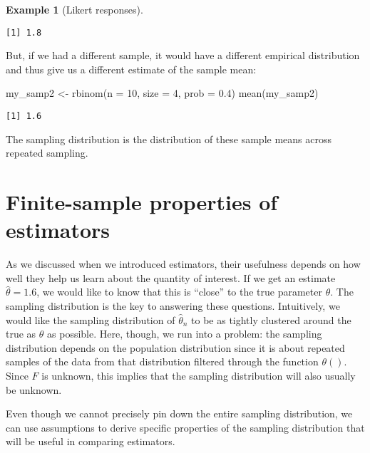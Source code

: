 \documentclass[
  letterpaper,
  DIV=11,
  numbers=noendperiod]{scrreprt}
\newenvironment{Shaded}{\begin{snugshade}}{\end{snugshade}}
\newcommand{\AttributeTok}[1]{\textcolor[rgb]{0.40,0.45,0.13}{#1}}
\newcommand{\DecValTok}[1]{\textcolor[rgb]{0.68,0.00,0.00}{#1}}
\newcommand{\FloatTok}[1]{\textcolor[rgb]{0.68,0.00,0.00}{#1}}
\newcommand{\FunctionTok}[1]{\textcolor[rgb]{0.28,0.35,0.67}{#1}}
\newcommand{\NormalTok}[1]{\textcolor[rgb]{0.00,0.23,0.31}{#1}}
\newcommand{\OtherTok}[1]{\textcolor[rgb]{0.00,0.23,0.31}{#1}}
\theoremstyle{definition}
\theoremstyle{plain}
\theoremstyle{definition}
\newtheorem{example}{Example}[chapter]
\theoremstyle{remark}
\begin{document}
\begin{example}[Likert responses]
\begin{verbatim}
[1] 1.8
\end{verbatim}

But, if we had a different sample, it would have a different empirical
distribution and thus give us a different estimate of the sample mean:

\begin{Shaded}
\begin{Highlighting}[]
\NormalTok{my\_samp2 }\OtherTok{\textless{}{-}} \FunctionTok{rbinom}\NormalTok{(}\AttributeTok{n =} \DecValTok{10}\NormalTok{, }\AttributeTok{size =} \DecValTok{4}\NormalTok{, }\AttributeTok{prob =} \FloatTok{0.4}\NormalTok{)}
\FunctionTok{mean}\NormalTok{(my\_samp2) }
\end{Highlighting}
\end{Shaded}

\begin{verbatim}
[1] 1.6
\end{verbatim}

The sampling distribution is the distribution of these sample means
across repeated sampling.

\end{example}

\hypertarget{finite-sample-properties-of-estimators}{%
\section{Finite-sample properties of
estimators}\label{finite-sample-properties-of-estimators}}

As we discussed when we introduced estimators, their usefulness depends
on how well they help us learn about the quantity of interest. If we get
an estimate \(\widehat{\theta} = 1.6\), we would like to know that this
is ``close'' to the true parameter \(\theta\). The sampling distribution
is the key to answering these questions. Intuitively, we would like the
sampling distribution of \(\widehat{\theta}_n\) to be as tightly
clustered around the true as \(\theta\) as possible. Here, though, we
run into a problem: the sampling distribution depends on the population
distribution since it is about repeated samples of the data from that
distribution filtered through the function \(\theta()\). Since \(F\) is
unknown, this implies that the sampling distribution will also usually
be unknown.

Even though we cannot precisely pin down the entire sampling
distribution, we can use assumptions to derive specific properties of
the sampling distribution that will be useful in comparing estimators.
\end{document}
